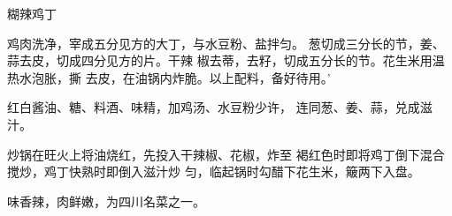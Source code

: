 \begin{recipe}[宫保鸡丁]{糊辣鸡丁}

\ingredients


\cooking

\step 鸡肉洗净，宰成五分见方的大丁，与水豆粉、盐拌匀。 葱切成三分长的节，姜、蒜去皮，切成四分见方的片。干辣 椒去蒂，去籽，切成五分长的节。花生米用温热水泡胀，撕 去皮，在油锅内炸脆。以上配料，备好待用。’

\step 红白酱油、糖、料酒、味精，加鸡汤、水豆粉少许， 连同葱、姜、蒜，兑成滋汁。

\step 炒锅在旺火上将油烧红，先投入干辣椒、花椒，炸至 褐红色时即将鸡丁倒下混合搅炒，鸡丁快熟时即倒入滋汁炒 匀，临起锅时勾醋下花生米，簸两下入盘。

\notes

味香辣，肉鲜嫩，为四川名菜之一。

\end{recipe}

